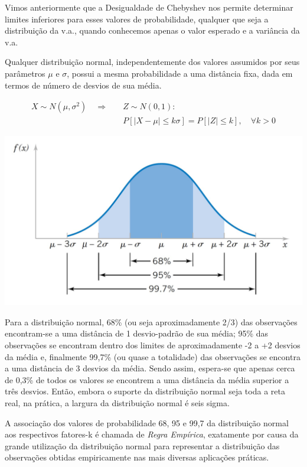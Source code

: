 \documentclass[
]{book}
\theoremstyle{definition}
\theoremstyle{definition}
\theoremstyle{definition}
\theoremstyle{remark}
\begin{document}
Vimos anteriormente que a Desigualdade de Chebyshev nos permite determinar limites inferiores para esses valores de probabilidade, qualquer que seja a distribuição da v.a., quando conhecemos apenas o valor esperado e a variância da v.a.

Qualquer distribuição normal, independentemente dos valores assumidos por seus parâmetros \(\mu\) e \(\sigma\), possui a mesma probabilidade a uma distância fixa, dada em termos de número de desvios de sua média.

\begin{align*}
  X \sim N(\mu, \sigma^2) \quad \Longrightarrow \quad 
  &Z \sim N(0,1):\\ 
  &P[|X -\mu| \leq k\sigma] = P[|Z| \leq k], \quad \forall k>0
\end{align*}

\begin{center}\includegraphics[width=0.7\linewidth]{img/distr-normal-regra-empirica} \end{center}

Para a distribuição normal, 68\% (ou seja aproximadamente 2/3) das observações encontram-se a uma distância de 1 desvio-padrão de sua média; 95\% das observações se encontram dentro dos limites de aproximadamente -2 a +2 desvios da média e, finalmente 99,7\% (ou quase a totalidade) das observações se encontra a uma distância de 3 desvios da média. Sendo assim, espera-se que apenas cerca de 0,3\% de todos os valores se encontrem a uma distância da média superior a três desvios. Então, embora o suporte da distribuição normal seja toda a reta real, na prática, a largura da distribuição normal é seis sigma.

A associação dos valores de probabilidade 68, 95 e 99,7 da distribuição normal aos respectivos fatores-k é chamada de \emph{Regra Empírica}, exatamente por causa da grande utilização da distribuição normal para representar a distribuição das observações obtidas empiricamente nas mais diversas aplicações práticas.
\end{document}
